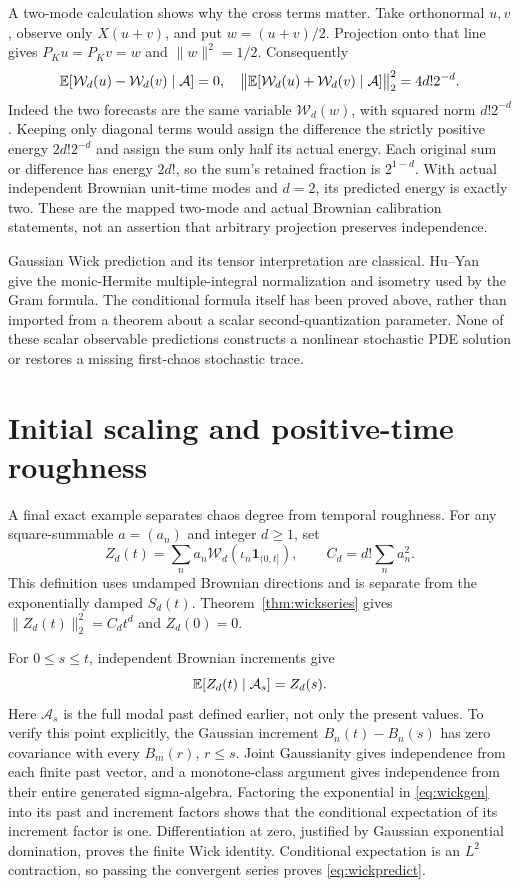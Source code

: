\documentclass[11pt]{article}
\begin{document}
A two-mode calculation shows why the cross terms matter. Take
orthonormal $u,v$, observe only $X(u+v)$, and put $w=(u+v)/2$.
Projection onto that line gives $P_Ku=P_Kv=w$ and $\|w\|^2=1/2$.
Consequently
\[
 \mathbb E[\mathcal W_d(u)-\mathcal W_d(v)\mid\mathcal A]=0,
 \quad
 \big\|\mathbb E[\mathcal W_d(u)+\mathcal W_d(v)\mid\mathcal A]\big\|_2^2
       =4d!2^{-d}.
\]
Indeed the two forecasts are the same variable
$\mathcal W_d(w)$, with squared norm $d!2^{-d}$.
Keeping only diagonal terms would assign the difference the
strictly positive energy $2d!2^{-d}$ and assign the sum only half
its actual energy. Each original sum or difference has energy
$2d!$, so the sum's retained fraction is $2^{1-d}$. With actual
independent Brownian unit-time modes and $d=2$, its predicted
energy is exactly two. These are the mapped two-mode and actual
Brownian calibration statements, not an assertion that arbitrary
projection preserves independence.

Gaussian Wick prediction and its tensor interpretation are
classical. Hu--Yan~\cite[Section 2, (2.6)--(2.7)]{HuYan} give the
monic-Hermite multiple-integral normalization and isometry used
by the Gram formula. The conditional formula itself has been
proved above, rather than imported from a theorem about a scalar
second-quantization parameter. None of these scalar observable
predictions constructs a nonlinear stochastic PDE solution or
restores a missing first-chaos stochastic trace.

\section{Initial scaling and positive-time roughness}
A final exact example separates chaos degree from temporal roughness.
For any square-summable $a=(a_n)$ and integer $d\geq1$, set
\[
 Z_d(t)=\sum_n a_n\mathcal W_d(\iota_n\mathbf1_{(0,t]}),
 \qquad C_d=d!\sum_na_n^2.
\]
This definition uses undamped Brownian directions and is separate from
the exponentially damped $S_d(t)$. Theorem~\ref{thm:wickseries} gives
$\|Z_d(t)\|_2^2=C_dt^d$ and $Z_d(0)=0$.

For $0\leq s\leq t$, independent Brownian increments give
\begin{equation}\label{eq:wickpredict}
 \mathbb E[Z_d(t)\mid\mathcal A_s]=Z_d(s).
\end{equation}
Here $\mathcal A_s$ is the full modal past defined earlier, not only
the present values. To verify this point explicitly, the Gaussian
increment $B_n(t)-B_n(s)$ has zero covariance with every
$B_m(r)$, $r\leq s$. Joint Gaussianity gives independence from each
finite past vector, and a monotone-class argument gives independence
from their entire generated sigma-algebra. Factoring the exponential
in \eqref{eq:wickgen} into its past and increment factors shows that
the conditional expectation of its increment factor is one.
Differentiation at zero, justified by Gaussian exponential domination,
proves the finite Wick identity. Conditional expectation is an
$L^2$ contraction, so passing the convergent series proves
\eqref{eq:wickpredict}.
\end{document}
